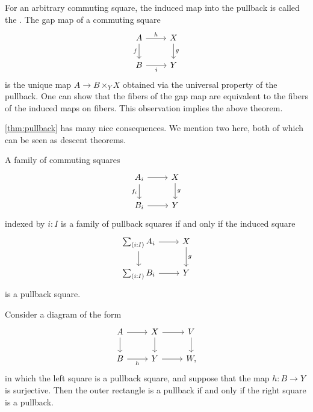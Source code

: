 \documentclass[9pt,twosided]{amsart}
\begin{document}
For an arbitrary commuting square, the induced map into the pullback is called the . The gap map of a commuting square
  \begin{equation*}
    \begin{tikzcd}
      A \arrow[r,"h"] \arrow[d,swap,"f"] & X \arrow[d,"g"] \\
      B \arrow[r,swap,"i"] & Y
    \end{tikzcd}
  \end{equation*}
is the unique map $A\to B\times_Y X$ obtained via the universal property of the pullback. One can show that the fibers of the gap map are equivalent to the fibers of the induced maps on fibers. This observation implies the above theorem.

\cref{thm:pullback} has many nice consequences. We mention two here, both of which can be seen as descent theorems.

\begin{thm}\label{thm:descent-sigma}
  A family of commuting squares
\begin{equation*}
  \begin{tikzcd}
    A_i \arrow[d,swap,"f_i"] \arrow[r] & X \arrow[d,"g"] \\
    B_i \arrow[r] & Y
  \end{tikzcd}
\end{equation*}
indexed by $i:I$ is a family of pullback squares if and only if the induced square
\begin{equation*}
  \begin{tikzcd}
    \sm{i:I}A_i \arrow[d] \arrow[r] & X \arrow[d,"g"] \\
    \sm{i:I}B_i \arrow[r] & Y
  \end{tikzcd}
\end{equation*}
is a pullback square.
\end{thm}

\begin{thm}\label{thm:descent-surjective}
  Consider a diagram of the form
  \begin{equation*}
    \begin{tikzcd}
      A \arrow[d] \arrow[r] & X \arrow[d] \arrow[r] & V \arrow[d] \\
      B \arrow[r,swap,"h"] & Y \arrow[r] & W,
    \end{tikzcd}
  \end{equation*}
  in which the left square is a pullback square, and suppose that the map $h:B\to Y$ is surjective. Then the outer rectangle is a pullback if and only if the right square is a pullback.
\end{thm}
\end{document}
